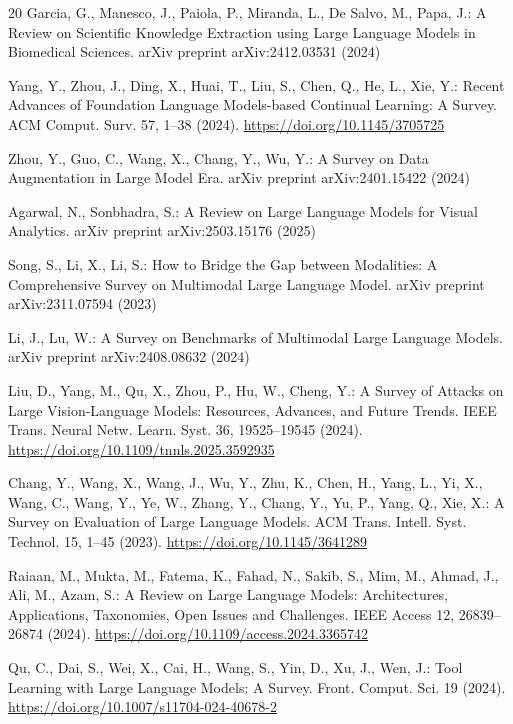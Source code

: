 \documentclass{svproc}
\begin{document}
\begin{thebibliography}{20}
Garcia, G., Manesco, J., Paiola, P., Miranda, L., De Salvo, M., Papa, J.: A Review on Scientific Knowledge Extraction using Large Language Models in Biomedical Sciences. arXiv preprint arXiv:2412.03531 (2024)

Yang, Y., Zhou, J., Ding, X., Huai, T., Liu, S., Chen, Q., He, L., Xie, Y.: Recent Advances of Foundation Language Models-based Continual Learning: A Survey. ACM Comput. Surv. 57, 1--38 (2024). \url{https://doi.org/10.1145/3705725}

Zhou, Y., Guo, C., Wang, X., Chang, Y., Wu, Y.: A Survey on Data Augmentation in Large Model Era. arXiv preprint arXiv:2401.15422 (2024)

Agarwal, N., Sonbhadra, S.: A Review on Large Language Models for Visual Analytics. arXiv preprint arXiv:2503.15176 (2025)

Song, S., Li, X., Li, S.: How to Bridge the Gap between Modalities: A Comprehensive Survey on Multimodal Large Language Model. arXiv preprint arXiv:2311.07594 (2023)

Li, J., Lu, W.: A Survey on Benchmarks of Multimodal Large Language Models. arXiv preprint arXiv:2408.08632 (2024)

Liu, D., Yang, M., Qu, X., Zhou, P., Hu, W., Cheng, Y.: A Survey of Attacks on Large Vision-Language Models: Resources, Advances, and Future Trends. IEEE Trans. Neural Netw. Learn. Syst. 36, 19525--19545 (2024). \url{https://doi.org/10.1109/tnnls.2025.3592935}

Chang, Y., Wang, X., Wang, J., Wu, Y., Zhu, K., Chen, H., Yang, L., Yi, X., Wang, C., Wang, Y., Ye, W., Zhang, Y., Chang, Y., Yu, P., Yang, Q., Xie, X.: A Survey on Evaluation of Large Language Models. ACM Trans. Intell. Syst. Technol. 15, 1--45 (2023). \url{https://doi.org/10.1145/3641289}

Raiaan, M., Mukta, M., Fatema, K., Fahad, N., Sakib, S., Mim, M., Ahmad, J., Ali, M., Azam, S.: A Review on Large Language Models: Architectures, Applications, Taxonomies, Open Issues and Challenges. IEEE Access 12, 26839--26874 (2024). \url{https://doi.org/10.1109/access.2024.3365742}

Qu, C., Dai, S., Wei, X., Cai, H., Wang, S., Yin, D., Xu, J., Wen, J.: Tool Learning with Large Language Models: A Survey. Front. Comput. Sci. 19 (2024). \url{https://doi.org/10.1007/s11704-024-40678-2}

\end{thebibliography}
\end{document}
